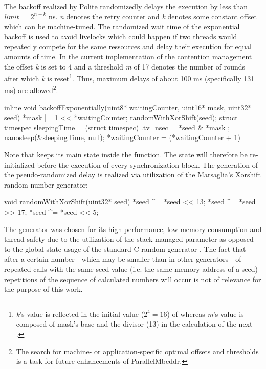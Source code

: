 The backoff realized by Polite randomizedly delays the execution  by less than \textit{limit} $ = 2^{n+k}$ ns\cite{AdvancedContentionManagement}. \textit{n} denotes the retry counter and \textit{k} denotes some constant offset which can be machine-tuned. The randomized wait time of the exponential backoff is used to avoid livelocks which could happen if two threads would repeatedly compete for the same ressources and delay their execution for equal amounts of time. In the current implementation  of the contention management the offset \textit{k} is set to 4 and a threshold \textit{m} of 17 denotes the number of rounds after which \textit{k} is reset\footnote{\textit{k}'s value is reflected in the initial value ($2^4 = 16$) of  whereas \textit{m}'s value is composed of mask's base and the divisor (13) in the calculation of the next .}. Thus, maximum delays of about 100 ms (specifically 131 ms) are allowed\footnote{The search for machine- or application-specific optimal offsets and thresholds is a task for future enhancements of ParallelMbeddr.}. 
\begin{ccode}
inline void backoffExponentially(uint8* waitingCounter, uint16* mask, uint32* seed) { 
  *mask |= 1 << *waitingCounter; 
  randomWithXorShift(seed); 
  struct timespec sleepingTime = (struct timespec){ .tv_nsec = *seed & *mask }; 
  nanosleep(&sleepingTime, null); 
  *waitingCounter = (*waitingCounter + 1) %
}
\end{ccode}
Note that  keeps its main state inside the  function. The state will therefore be re-initialized before the execution of every synchronization block. The generation of the pseudo-randomized delay is realized via utilization of the Marsaglia's Xorshift random number generator\cite{XorshiftRngs}:
\begin{ccode}
void randomWithXorShift(uint32* seed) { 
  *seed ^= *seed << 13; 
  *seed ^= *seed >> 17; 
  *seed ^= *seed << 5; 
}
\end{ccode}
The generator was chosen for its high performance, low memory consumption and thread safety due to the utilization of the stack-managed  parameter as opposed to the global state usage of the standard C random generator . The fact that after a certain number---which may be smaller than in other generators---of repeated calls with the same seed value (i.e. the same memory address of a seed) repetitions of the sequence of calculated numbers will occur is not of relevance for the purpose of this work.